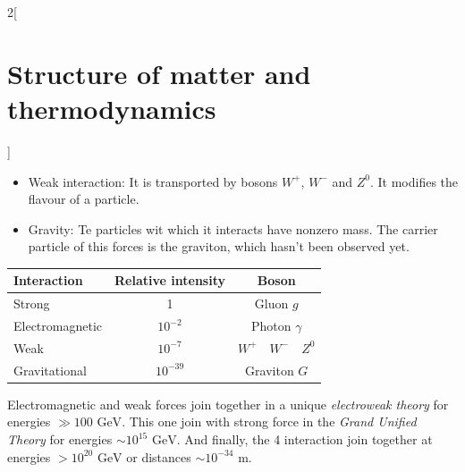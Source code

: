 \documentclass[../../../main.tex]{subfiles}
\begin{document}
\begin{multicols}{2}[\section{Structure of matter and thermodynamics}]
\begin{definition}
\begin{itemize}
            \item Weak interaction: It is transported by bosons $W^+$, $W^-$ and $Z^0$. It modifies the flavour of a particle.
            \item Gravity: Te particles wit which it interacts have nonzero mass. The carrier particle of this forces is the graviton, which hasn't been observed yet.
        \end{itemize}
        \begin{center}
            \begin{minipage}{\linewidth}
                \centering
                \begin{tabular}{lcc}
                    \hline
                    \hline
                    Interaction     & Relative intensity & Boson                   \\
                    \hline
                    Strong          & 1                  & Gluon $g$               \\
                    Electromagnetic & $10^{-2}$          & Photon $\gamma$         \\
                    Weak            & $10^{-7}$          & $W^+\quad W^-\quad Z^0$ \\
                    Gravitational   & $10^{-39}$         & Graviton $G$            \\
                    \hline
                    \hline
                \end{tabular}
            \end{minipage}
        \end{center}
    \end{definition}
    \begin{definition}
        Electromagnetic and weak forces join together in a unique \textit{electroweak theory} for energies $\gg 100\text{ GeV}$. This one join with strong force in the \textit{Grand Unified Theory} for energies $\sim 10^{15}\text{ GeV}$. And finally, the 4 interaction join together at energies $>10^{20}\text{ GeV}$ or distances $\sim 10^{-34}\text{ m}$.
    \end{definition}

\end{multicols}
\end{document}
